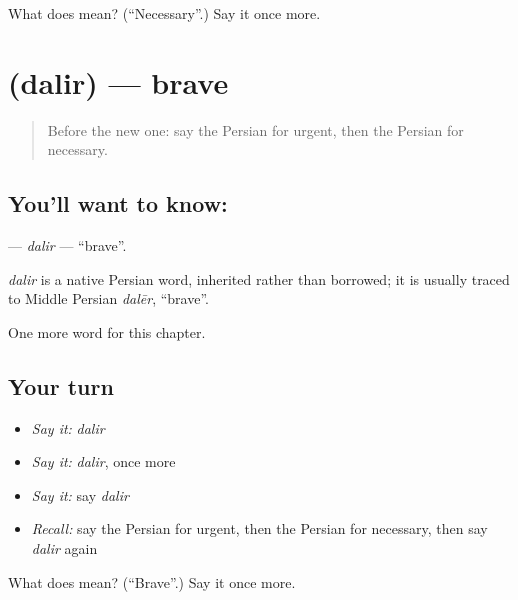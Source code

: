 \begin{tcolorbox}[breakable,colback=teal!4,colframe=teal!35!black,title={Before you move on}]
What does  mean? (\textquotedblleft{}Necessary\textquotedblright{}.) Say it once more.
\end{tcolorbox}
\section[\texorpdfstring{\fa{دلیر} (dalir)}{دلیر (dalir)}]{ (dalir) — brave}

\label{lesson:FA-C162-dalir}



\begin{quote}
Before the new one: say the Persian for urgent, then the Persian for necessary.
\end{quote}

\subsection*{You'll want to know: }
\textbf{} — \emph{dalir} — \textquotedblleft{}brave\textquotedblright{}.

\begin{cousinweb}
\emph{dalir} is a native Persian word, inherited rather than borrowed; it is usually traced to Middle Persian \emph{dalēr}, \textquotedblleft{}brave\textquotedblright{}.
\end{cousinweb}

\begin{grammarlens}[title={What you've built}]
One more word for this chapter.
\end{grammarlens}

\subsection*{Your turn}
\begin{itemize}
\raggedright
  \item \emph{Say it:} \emph{dalir}
  \item \emph{Say it:} \emph{dalir}, once more
  \item \emph{Say it:} say \emph{dalir}
  \item \emph{Recall:} say the Persian for urgent, then the Persian for necessary, then say \emph{dalir} again
\end{itemize}

\begin{tcolorbox}[breakable,colback=teal!4,colframe=teal!35!black,title={Before you move on}]
What does  mean? (\textquotedblleft{}Brave\textquotedblright{}.) Say it once more.
\end{tcolorbox}

